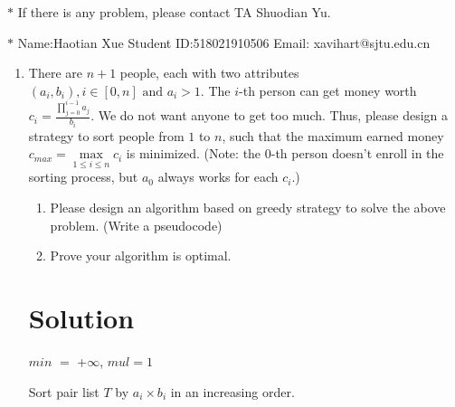 \documentclass[12pt,a4paper]{article}
\theoremstyle{definition}
\begin{document}
\noindent

\noindent{}
\begin{center}
\footnotesize{\color{red}$*$ If there is any problem, please contact TA Shuodian Yu.}

\footnotesize{\color{blue}$*$ Name:Haotian Xue  \quad Student ID:518021910506 \quad Email: xavihart@sjtu.edu.cn}
\end{center}

\begin{enumerate}
    \item
    There are $n+1$ people, each with two attributes $(a_i,b_i), i\in[0,n] \text{ and } a_i>1$. The $i$-th person can get money worth $c_i = \frac{\prod_{j=0}^{i-1}{a_j}}{b_i}$. We do not want anyone to get too much. Thus, please design a strategy to sort people from $1$ to $n$, such that the maximum earned money $c_{max}=\max\limits_{1\leq i\leq n} c_i$ is minimized. (Note: the 0-th person doesn't enroll in the sorting process, but $a_0$ always works for each $c_i$.)
    \begin{enumerate}
        \item Please design an algorithm based on greedy strategy to solve the above problem. (Write a pseudocode)
        \item Prove your algorithm is optimal.
    \end{enumerate}

    \section*{\normalsize{Solution}}
        \begin{minipage}[t]{0.80\textwidth}
       \begin{algorithm}[H]
           $min$ $=$ +$\infty$, $mul=1$
           
           Sort pair list $T$ by $a_i \times b_i$ in an increasing order.

        \end{algorithm}
        \end{minipage} 
    

\end{enumerate}
\end{document}
